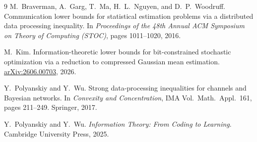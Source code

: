 \documentclass[11pt]{article}
\theoremstyle{plain}
\theoremstyle{definition}
\theoremstyle{remark}
\begin{document}
\begin{thebibliography}{9}
M.~Braverman, A.~Garg, T.~Ma, H.~L.~Nguyen, and D.~P.~Woodruff.
Communication lower bounds for statistical estimation problems via a distributed data processing inequality.
In \emph{Proceedings of the 48th Annual ACM Symposium on Theory of Computing (STOC)}, pages 1011--1020, 2016.

M.~Kim.
Information-theoretic lower bounds for bit-constrained stochastic optimization via a reduction to compressed Gaussian mean estimation.
\href{https://arxiv.org/abs/2606.00703}{arXiv:2606.00703}, 2026.

Y.~Polyanskiy and Y.~Wu.
Strong data-processing inequalities for channels and Bayesian networks.
In \emph{Convexity and Concentration}, IMA Vol.\ Math.\ Appl.~161, pages 211--249. Springer, 2017.

Y.~Polyanskiy and Y.~Wu.
\emph{Information Theory: From Coding to Learning}.
Cambridge University Press, 2025.
\end{thebibliography}
\end{document}
